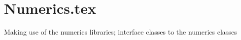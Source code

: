 \chapter{Numerics.tex}

Making use of the numerics libraries; interface classes to the numerics classes
